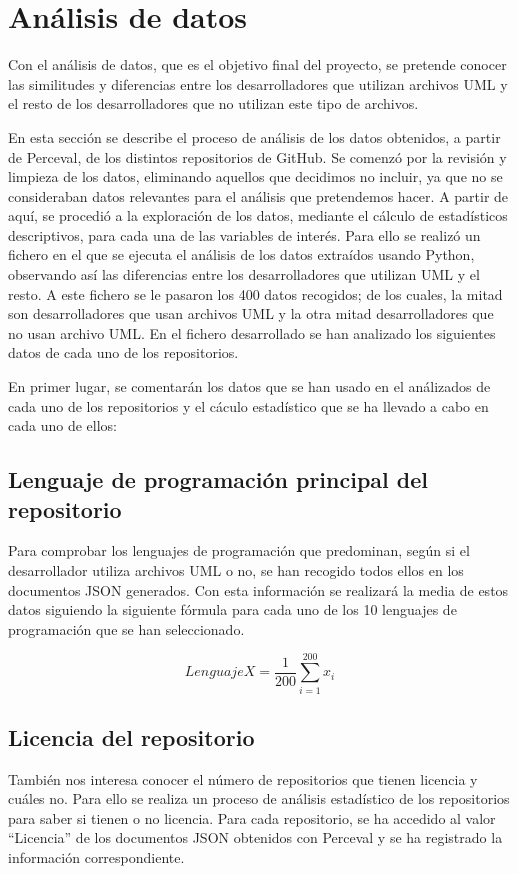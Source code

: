 \documentclass[a4paper, 12pt]{book}
\begin{document}
\section{Análisis de datos} %
\label{sec:análisis de datos}

Con el análisis de datos, que es el objetivo final del proyecto, se pretende conocer las similitudes y diferencias entre los desarrolladores que utilizan archivos UML y el resto de los desarrolladores que no utilizan este tipo de archivos.


En esta sección se describe el proceso de análisis de los datos obtenidos, a partir de Perceval, de los distintos repositorios de GitHub. 
Se comenzó por la revisión y limpieza de los datos, eliminando aquellos que decidimos no incluir, ya que no se consideraban datos relevantes para el análisis que pretendemos hacer. 
A partir de aquí, se procedió a la exploración de los datos, mediante el cálculo de estadísticos descriptivos, para cada una de las variables de interés. 
Para ello se realizó un fichero en el que se ejecuta el análisis de los datos extraídos usando Python, observando así las diferencias entre los desarrolladores que utilizan UML y el resto.
A este fichero se le pasaron los 400 datos recogidos; de los cuales, la mitad son desarrolladores que usan archivos UML y la otra mitad desarrolladores que no usan archivo UML. 
En el fichero desarrollado se han analizado los siguientes datos de cada uno de los repositorios. 


En primer lugar, se comentarán los datos que se han usado en el análizados de cada uno de los repositorios y el cáculo estadístico que se ha llevado a cabo en cada uno de ellos:


\subsection{Lenguaje de programación principal del repositorio} %
\label{sec:lenguaje de programación principal del repositorio}
Para comprobar los lenguajes de programación que predominan, según si el desarrollador utiliza archivos UML o no, se han recogido todos ellos en los documentos JSON generados.
Con esta información se realizará la media de estos datos siguiendo la siguiente fórmula para cada uno de los 10 lenguajes de programación que se han seleccionado.


\[{Lenguaje X} = \frac{1}{200} \sum_{i=1}^{200} x_i\]


\subsection{Licencia del repositorio} %
\label{sec:licencia del repositorio}
También nos interesa conocer el número de repositorios que tienen licencia y cuáles no.
Para ello se realiza un proceso de análisis estadístico de los repositorios para saber si tienen o no licencia.
Para cada repositorio, se ha accedido al valor ``Licencia'' de los documentos JSON obtenidos con Perceval y se ha registrado la información correspondiente.
\end{document}
